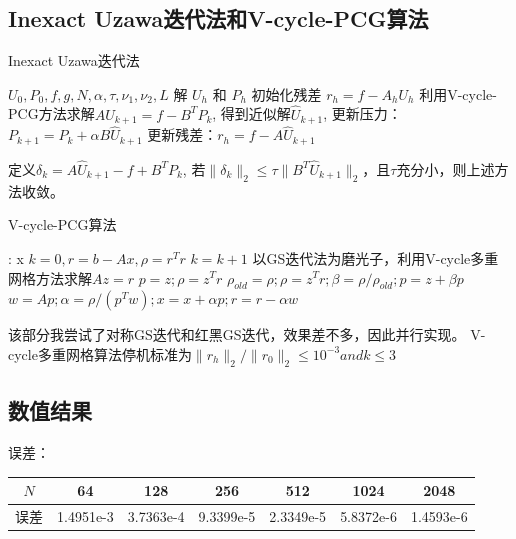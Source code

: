 \documentclass{article}
\begin{document}
\subsection{Inexact Uzawa迭代法和V-cycle-PCG算法}

\begin{algorithm}[!h]
  \caption{Inexact Uzawa迭代法}
  \begin{algorithmic}[1]
    \Require $U_0, P_0, f, g, N, \alpha, \tau, \nu_1, \nu_2, L$
    \Ensure 解 $U_h$ 和 $P_h$
    \State 初始化残差 $r_h = f - A_h U_h$
      \State 利用V-cycle-PCG方法求解$AU_{k+1} = f - B^T P_k$, 得到近似解$\hat{U}_{k+1}$,
      \State 更新压力：$P_{k+1} = P_k + \alpha B \hat{U}_{k+1}$
      \State 更新残差：$r_h = f - A \hat{U}_{k+1}$
    \EndWhile
  \end{algorithmic}
\end{algorithm}

定义$\delta_k = A \hat{U}_{k+1} - f + B^T P_k$, 若$\|\delta_k\|_2 \leq \tau \|B^T \hat{U}_{k+1}\|_2$，且$\tau$充分小，则上述方法收敛。

\begin{algorithm}[!h]
  \caption{V-cycle-PCG算法}
  \begin{algorithmic}[1]
    \Require: x
    \State $k=0, r = b - A x, \rho = r^T r$
      \State $k = k + 1$
      \State 以GS迭代法为磨光子，利用V-cycle多重网格方法求解$Az = r$
        $p = z; \rho = z^T r$
      \Else
        $\rho_{old} = \rho; \rho = z^T r; \beta = \rho/\rho_{old}; p = z + \beta p$
      \EndIf
      \State $w = A p; \alpha = \rho/(p^T w); x = x + \alpha p; r = r - \alpha w$
    \EndWhile
  \end{algorithmic}
\end{algorithm}

该部分我尝试了对称GS迭代和红黑GS迭代，效果差不多，因此并行实现。
V-cycle多重网格算法停机标准为$\|r_h\|_{2} / \|r_{0}\|_{2} \leq 10^{-3} and k \leq 3$

\subsection{数值结果}
误差：

\begin{table}[!h]
  \centering
  \begin{tabular}{ccccccc}
    \toprule
    $N$ & 64 & 128 & 256 & 512 & 1024 & 2048 \\
    \midrule
    误差 & 1.4951e-3 & 3.7363e-4 & 9.3399e-5 & 2.3349e-5 & 5.8372e-6 & 1.4593e-6 \\
    \bottomrule
  \end{tabular}
\end{table}
\end{document}
